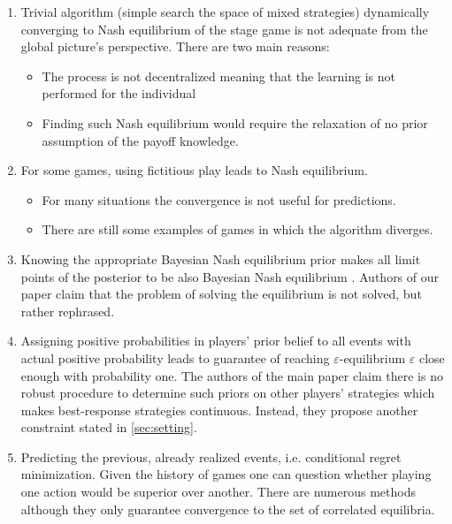 \documentclass[]{spie}  %
\begin{document}
\begin{enumerate}
    \item Trivial algorithm (simple search the space of mixed strategies) dynamically converging to Nash equilibrium of the stage game is not adequate from the global picture's perspective. There are two main reasons:
    \begin{itemize}
        \item The process is not decentralized meaning that the learning is not performed for the individual
        \item Finding such Nash equilibrium would require the relaxation of no prior assumption of the payoff knowledge.
    \end{itemize}
    \item For some games, using fictitious play leads to Nash equilibrium. \cite{milgrom1991adaptive} \cite{monderer1996potential}
    \begin{itemize}
        \item For many situations the convergence is not useful for predictions.
        \item There are still some examples of games in which the algorithm diverges. \cite{foster1998nonconvergence}
    \end{itemize}
    \item Knowing the appropriate Bayesian Nash equilibrium prior makes all limit points of the posterior to be also Bayesian Nash equilibrium \cite{jordan1995bayesian}. Authors of our paper claim that the problem  of solving the equilibrium is not solved, but rather rephrased.
    \item Assigning positive probabilities in players' prior belief to all events with actual positive probability leads to guarantee of reaching $\varepsilon$-equilibrium $\varepsilon$ close enough with probability one. \cite{kalai1993rational} The authors of the main paper claim there is no robust procedure to determine such priors on other players' strategies which makes best-response strategies continuous. Instead, they propose another constraint stated in \autoref{sec:setting}.
    \item Predicting the previous, already realized events, i.e. conditional regret minimization. Given the history of games one can question whether playing one action would be superior over another. There are numerous methods although they only guarantee convergence to the set of correlated equilibria. \cite{hart2000simple} \cite{foster1997calibrated}
\end{enumerate}
\end{document}
